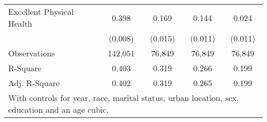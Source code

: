 \begin{table}
\begin{tabular}{l*{4}{c}}
Excellent Physical Health&       0.398\sym{***}&       0.169\sym{***}&       0.144\sym{***}&       0.024\sym{*}  \\
                    &     (0.008)         &     (0.015)         &     (0.011)         &     (0.011)         \\
\midrule
Observations        &      142,051         &       76,849         &       76,849         &       76,849         \\
R-Square            &       0.403         &       0.319         &       0.266         &       0.199         \\
Adj. R-Square       &       0.402         &       0.319         &       0.265         &       0.199         \\
\bottomrule
\multicolumn{5}{l}{\scriptsize{With controls for year, race, marital status, urban location, sex, education and an age cubic.}} \\
\end{tabular}
\end{table}
